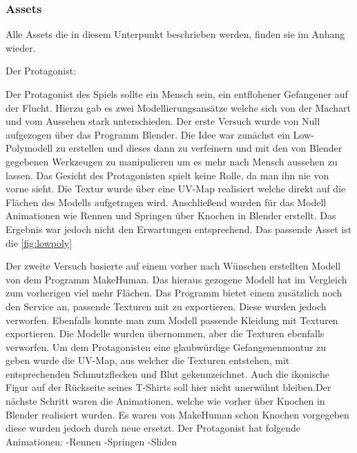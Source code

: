 \documentclass[12pt]{article}
\begin{document}
\vspace{1cm}
\subsubsection{Assets}

\begin{scriptsize} Alle Assets die in diesem Unterpunkt beschrieben werden, finden sie im Anhang wieder.\end{scriptsize}\newline

\noindent Der Protagonist:\newline

\noindent Der Protagonist des Spiels sollte ein Mensch sein, ein entflohener Gefangener auf der Flucht. 
Hierzu gab es zwei Modellierungsansätze welche sich von der Machart und vom Aussehen stark unterschieden. 
Der erste Versuch wurde von Null aufgezogen über das Programm Blender. Die Idee war zunächst ein Low-Polymodell zu erstellen und dieses dann zu verfeinern
und mit den von Blender gegebenen Werkzeugen zu manipulieren um es mehr nach Mensch aussehen zu lassen. Das Gesicht des Protagonisten spielt keine Rolle,
da man ihn nie von vorne sieht. Die Textur wurde über eine UV-Map realisiert welche direkt auf die Flächen des Modells aufgetragen wird. 
Anschließend wurden für das Modell Animationen wie Rennen und Springen über Knochen in Blender erstellt. Das Ergebnis war jedoch nicht den Erwartungen entsprechend.
Das passende Asset ist die \ref{fig:lowpoly}\newline

\noindent Der zweite Versuch basierte auf einem vorher nach Wünschen erstellten Modell von dem Programm MakeHuman. Das hieraus gezogene Modell hat im Vergleich zum vorherigen
viel mehr Flächen. Das Programm bietet einem zusätzlich noch den Service an, passende Texturen mit zu exportieren. Diese wurden jedoch verworfen. Ebenfalls konnte man zum
Modell passende Kleidung mit Texturen exportieren. Die Modelle wurden übernommen, aber die Texturen ebenfalls verworfen. Um dem Protagonisten eine glaubwürdige
Gefangenenmontur zu geben wurde die UV-Map, aus welcher die Texturen entstehen, mit entsprechenden Schmutzflecken und Blut gekennzeichnet. Auch die ikonische Figur
auf der Rückseite seines T-Shirts soll hier nicht unerwähnt bleiben.Der nächste Schritt waren die Animationen, welche wie vorher über Knochen in Blender realisiert wurden.
Es waren von MakeHuman schon Knochen vorgegeben diese wurden jedoch durch neue ersetzt. 
Der Protagonist hat folgende Animationen:\newline
	-Rennen\newline
	-Springen\newline
	-Sliden\newline
\end{document}
